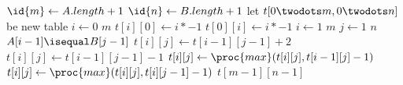 \begin{codebox}
\li $\id{m} \gets A.length + 1$
\li $\id{n} \gets B.length + 1$
\li let $t[0 \twodots m, 0 \twodots n]$ be new table
\li \For $i \gets 0$ \To $m$ \Do
\li $t[i][0] \gets i * -1$
\li $t[0][i] \gets i * -1$ \End
\li \For $i \gets 1$ \To $m$ \Do
\li \For $j \gets 1$ \To $n$ \Do
\li \If $A[i-1] \isequal B[j-1]$
\li \Then $t[i][j] \gets t[i - 1][j - 1] + 2$
\li \Else
\li $t[i][j] \gets t[i - 1][j - 1] - 1$ \End
\li $t[i][j] \gets \proc{max}(t[i][j],t[i-1][j]-1)$
\li $t[i][j] \gets \proc{max}(t[i][j],t[i][j-1]-1)$ \End \End
\li \Return $t[m - 1][n - 1]$
\end{codebox}
